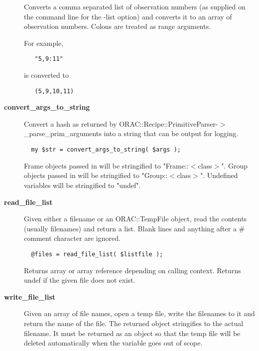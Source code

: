 \begin{description}
Converts a comma separated list of observation numbers (as supplied
on the command line for the -list option) and converts it to
an array of observation numbers. Colons are treated as range arguments.



For example,

\begin{verbatim}
   "5,9:11"
\end{verbatim}


is converted to

\begin{verbatim}
   (5,9,10,11)
\end{verbatim}

\item[{\textbf{convert\_args\_to\_string}}] \mbox{}

Convert a hash as returned by
ORAC::Recipe::PrimitiveParser-$>$\_parse\_prim\_arguments into a string
that can be output for logging.

\begin{verbatim}
  my $str = convert_args_to_string( $args );
\end{verbatim}


Frame objects passed in will be stringified to "Frame::$<$class$>$". Group
objects passed in will be stringified to "Group::$<$class$>$". Undefined
variables will be stringified to "undef".


\item[{\textbf{read\_file\_list}}] \mbox{}

Given either a filename or an ORAC::TempFile object, read the contents
(usually filenames) and return a list. Blank lines and anything after
 a \# comment character are ignored.

\begin{verbatim}
  @files = read_file_list( $listfile );
\end{verbatim}


Returns array or array reference depending on calling context. Returns
undef if the given file does not exist.


\item[{\textbf{write\_file\_list}}] \mbox{}

Given an array of file names, open a temp file, write the filenames
to it and return the name of the file. The returned object stringifies
to the actual filename. It must be returned as an object so that
the temp file will be deleted automatically when the variable
goes out of scope.


\end{description}
